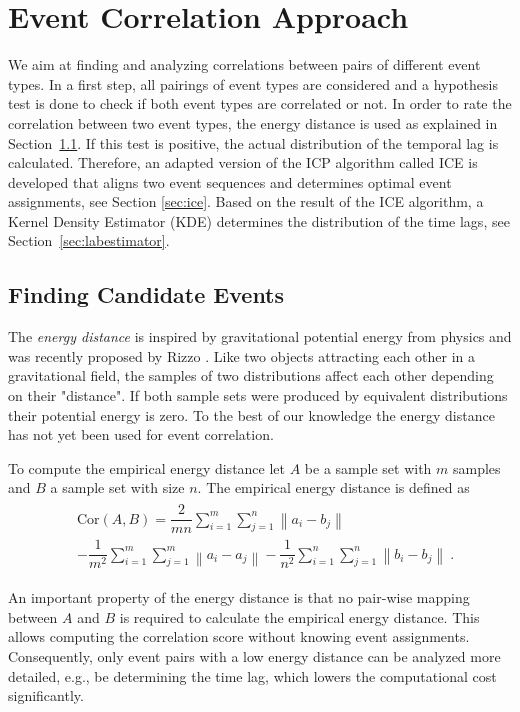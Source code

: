 \documentclass[conference]{IEEEtran}
\theoremstyle{examplestyle}
\begin{document}
\section{Event Correlation Approach}
We aim at finding and analyzing correlations between pairs of different event types. In a first step, all  pairings of event types are considered and a hypothesis test is done to check if both event types are correlated or not. In order to rate the correlation between two event types,  the energy distance \cite{Rizzo2016} is used as explained in Section~\ref{sec:energyDistance}. 
If this test is positive, the actual distribution of the temporal lag is calculated. Therefore, an adapted version of the \ac{ICP} algorithm called \ac{ICE} is developed that aligns two event sequences and determines optimal event assignments, see Section \ref{sec:ice}.
Based on the result of the \ac{ICE} algorithm, a Kernel Density Estimator (KDE) determines the distribution of the time lags,  see Section~\ref{sec:labestimator}.




\subsection{Finding Candidate Events}
\label{sec:energyDistance}
The \textit{energy distance} is inspired by gravitational potential energy from physics and was recently proposed by Rizzo \cite{Rizzo2016}. Like two objects attracting each other in a gravitational field, the samples of two distributions affect each other depending on their "distance". If both sample sets were produced by equivalent distributions their potential energy is zero. To the best of our knowledge the energy distance has not yet been used for event correlation.

To compute the empirical energy distance let \(A\) be a sample set with \(m\) samples and \(B\) a sample set with size \(n\). The empirical energy distance is defined as
\begin{align}
\begin{split}
	& \text{Cor}(A, B) = \dfrac{2}{m n} \sum_{i = 1}^m \sum_{j = 1}^n \left\| a_i - b_j \right\| \\
	& - \dfrac{1}{m^2} \sum_{i = 1}^m \sum_{j = 1}^m \left\| a_i - a_j \right\| - \dfrac{1}{n^2} \sum_{i = 1}^n \sum_{j = 1}^n \left\| b_i - b_j \right\| ~.
\end{split}
\end{align}

An important property of the energy distance is that no pair-wise  mapping between \(A\) and \(B\) is required to calculate the empirical energy distance. This allows computing the correlation score without knowing event assignments. 
Consequently, only event pairs with a low energy distance can be analyzed more detailed, e.g., be determining the time lag, which lowers the computational cost significantly.
\end{document}
